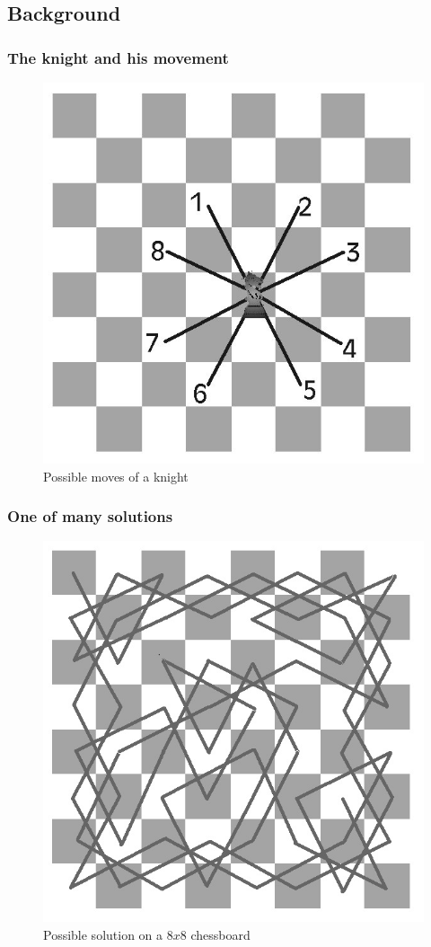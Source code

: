 \documentclass{beamer}
\begin{document}
\subsection{Background}
\begin{frame}
\frametitle{The knight and his movement}
\begin{figure}
\includegraphics[scale=0.25]{sprung}
\caption{Possible moves of a knight}
\end{figure}
\end{frame}

\begin{frame}
\frametitle{One of many solutions}
\begin{figure}
\includegraphics[scale=0.4]{loesung}
\caption{Possible solution on a $8x8$ chessboard}
\end{figure}
\end{frame}
\end{document}
